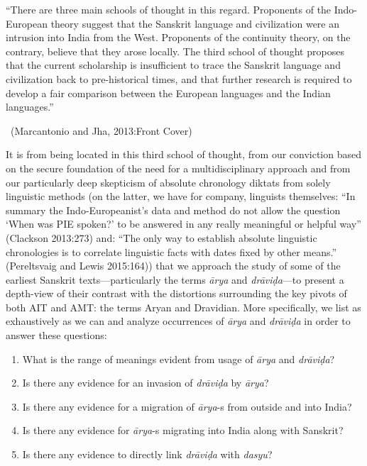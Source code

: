 \begin{myquote}
“There are three main schools of thought in this regard. Proponents of the Indo-European theory suggest that the Sanskrit language and civilization were an intrusion into India from the West. Proponents of the continuity theory, on the contrary, believe that they arose locally. The third school of thought proposes that the current scholarship is insufficient to trace the Sanskrit language and civilization back to pre-historical times, and that further research is required to develop a fair comparison between the European languages and the Indian languages.”

~\hfill (Marcantonio and Jha, 2013:Front Cover)
\end{myquote}

It is from being located in this third school of thought, from our conviction based on the secure foundation of the need for a multidisciplinary approach and from our particularly deep skepticism of absolute chronology diktats from solely linguistic methods (on the latter, we have for company, linguists themselves: “In summary the Indo-Europeanist’s data and method do not allow the question ‘When was PIE spoken?’ to be answered in any really meaningful or helpful way” (Clackson 2013:273) and: “The only way to establish absolute linguistic chronologies is to correlate linguistic facts with dates fixed by other means.” (Pereltsvaig and Lewis 2015:164)) that we approach the study of some of the earliest Sanskrit texts—particularly the terms \textit{ārya} and \textit{drāviḍa}—to present a depth-view of their contrast with the distortions surrounding the key pivots of both AIT and AMT: the terms Aryan and Dravidian. More specifically, we list as exhaustively as we can and analyze occurrences of \textit{ārya} and \textit{drāviḍa }in order to answer these questions:

\begin{enumerate}
\itemsep=0pt
\item What is the range of meanings evident from usage of \textit{ārya} and \textit{drāviḍa}?

 \item Is there any evidence for an invasion of \textit{drāviḍa }by \textit{ārya}?

 \item Is there any evidence for a migration of \textit{ārya}-s from outside and into India?

 \item Is there any evidence for \textit{ārya}-s migrating into India along with Sanskrit?

 \item Is there any evidence to directly link \textit{drāviḍa }with \textit{dasyu}?

\end{enumerate}


